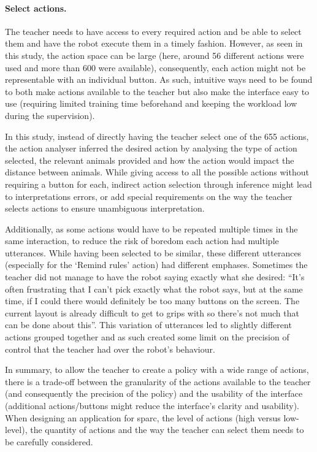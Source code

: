 \paragraph{Select actions.} 
The teacher needs to have access to every required action and be able to select them and have the robot execute them in a timely fashion. However, as seen in this study, the action space can be large (here, around 56 different actions were used and more than 600 were available), consequently, each action might not be representable with an individual button. As such, intuitive ways need to be found to both make actions available to the teacher but also make the interface easy to use (requiring limited training time beforehand and keeping the workload low during the supervision). 

In this study, instead of directly having the teacher select one of the 655 actions, the action analyser inferred the desired action by analysing the type of action selected, the relevant animals provided and how the action would impact the distance between animals. While giving access to all the possible actions without requiring a button for each, indirect action selection through inference might lead to interpretations errors, or add special requirements on the way the teacher selects actions to ensure unambiguous interpretation. 

Additionally, as some actions would have to be repeated multiple times in the same interaction, to reduce the risk of boredom each action had multiple utterances. While having been selected to be similar, these different utterances (especially for the `Remind rules' action) had different emphases. Sometimes the teacher did not manage to have the robot saying exactly what she desired: ``It’s often frustrating that I can’t pick exactly what the robot says, but at the same time, if I could there would definitely be too many buttons on the screen. The current layout is already difficult to get to grips with so there’s not much that can be done about this''. This variation of utterances led to slightly different actions grouped together and as such created some limit on the precision of control that the teacher had over the robot's behaviour.

In summary, to allow the teacher to create a policy with a wide range of actions, there is a trade-off between the granularity of the actions available to the teacher (and consequently the precision of the policy) and the usability of the interface (additional actions/buttons might reduce the interface's clarity and usability). When designing an application for \gls{sparc}, the level of actions (high versus low-level), the quantity of actions and the way the teacher can select them needs to be carefully considered.

